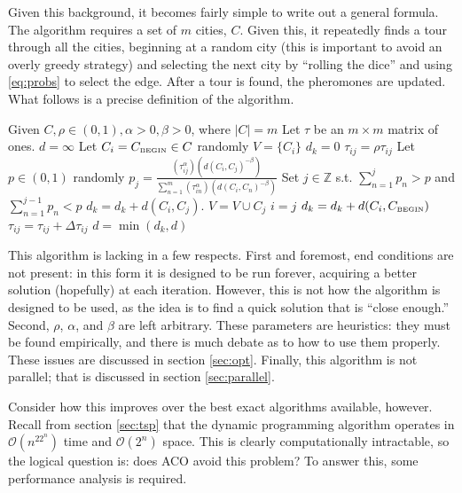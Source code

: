 \documentclass[twocolumn]{article}
\begin{document}
Given this background, it becomes fairly simple to write out a general 
formula. The algorithm requires a set of $m$ cities, $C$. Given this, 
it repeatedly finds a tour through all the cities, beginning at a random city
(this is important to avoid an overly greedy strategy) 
and selecting the next city by ``rolling the dice'' and
using \eqref{eq:probs} to select the edge. After a tour is found, the 
pheromones are updated. What follows is a precise definition of the algorithm. 

\begin{algorithmic}
  \State Given $C, \rho \in (0,1), \alpha > 0, \beta > 0$, where $|C| = m$
  \State Let $\tau$ be an $m \times m$ matrix of ones.
  \State $d = \infty$
    \State Let $C_i = C_{\mbox{{\tiny BEGIN}}}\in C$ randomly
    \State $V = \{ C_i \}$
    \State $d_k = 0$
    \State $\tau_{ij} = \rho \tau_{ij}$
       \State Let $p \in (0,1)$ randomly
       \State $\displaystyle p_j = \frac{(\tau_{ij}^\alpha)(d(C_i,C_j)^{-\beta})}{\displaystyle 
         \sum_{n=1}^m (\tau_{in}^\alpha) (d(C_i,C_n)^{-\beta})}$
       \State Set $j \in \mathbb{Z}$ s.t. $\displaystyle \sum_{n=1}^j p_n > p$ and 
       $\displaystyle \sum_{n=1}^{j-1} p_n < p$
       \State $d_k = d_k + d(C_i,C_j)$.
       \State $V = V \cup C_j$
       \State $i = j$
    \EndWhile
    \State $d_k = d_k + d(C_i,C_{\mbox{{\tiny BEGIN}}})$
    \State $\tau_{ij} = \tau_{ij} + \Delta \tau_{ij}$
    \State $d = \min (d_k, d)$
  \EndFor 
\end{algorithmic}

This algorithm is lacking in a few respects. First and foremost, end conditions are not present:
in this form it is designed to be run forever, acquiring a better solution (hopefully) at each
iteration. However, this is not how the algorithm is designed to be used, as the idea is to find
a quick solution that is ``close enough.'' Second, $\rho$, $\alpha$, and $\beta$ are left 
arbitrary. These parameters are heuristics: they must be found empirically, and there is much 
debate as to how to use them properly. These issues are discussed in section \ref{sec:opt}.
Finally, this algorithm is not parallel; that is discussed in section \ref{sec:parallel}. 

Consider how this improves over the best exact algorithms available, however. 
Recall from section
\ref{sec:tsp} that the dynamic programming algorithm operates in $\mathcal{O}(n^22^n)$ time
and $\mathcal{O}(2^n)$ space. This is clearly computationally intractable, so the logical
question is: does ACO avoid this problem? To answer this, some performance analysis is 
required. 
\end{document}

